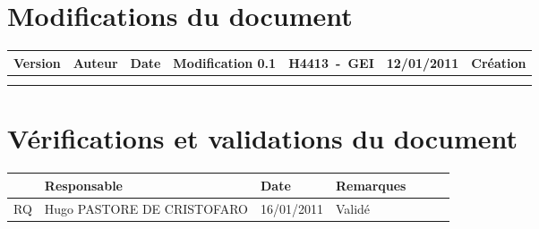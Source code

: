 
\section*{Modifications du document}

\begin{center}
\begin{longtable}{|m{14mm}||m{36mm}|m{36mm}|m{60mm}|}
\hline
Version & Auteur & Date & Modification\endhead \hline
0.1
& %
H4413~-~GEI
& %
12/01/2011
& %
Création
\\\hline

& %

& %

& %

\\\hline

& %

& %

& %

\\\hline
\end{longtable}
\end{center}


\section*{Vérifications et validations du document}

\begin{center}
\begin{longtable}{|m{15mm}|m{36mm}|m{36mm}|m{60mm}|}
\hline
 & Responsable & Date & Remarques\endhead \hline

& %

& %

& %

\\\hline
RQ
& %
Hugo PASTORE DE CRISTOFARO
& %
16/01/2011
& %
Validé
\\\hline
\end{longtable}
\end{center}

\pagebreak

